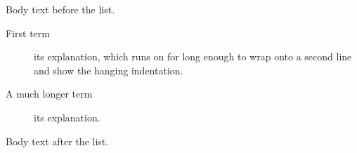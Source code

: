 \documentclass{article}
\begin{document}
Body text before the list.

\begin{description}
  \item[First term] its explanation, which runs on for long enough to wrap
    onto a second line and show the hanging indentation.
  \item[A much longer term] its explanation.
\end{description}

Body text after the list.
\end{document}
